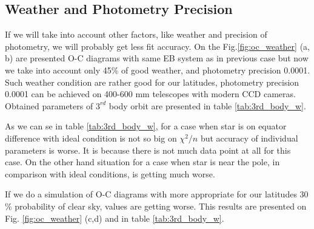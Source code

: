 \subsection{Weather and Photometry Precision}
If we will take into account other factors, like weather and precision of photometry, we will probably get less fit accuracy. 
On the Fig.\ref{fig:oc_weather} (a, b) are presented O-C diagrams with same EB system as in previous case but now we take into account only 45\% of good weather, and photometry precision 0.0001. Such weather condition are rather good for our latitudes, photometry precision 0.0001 can be achieved on 400-600 mm telescopes with modern CCD cameras. Obtained parameters of $3^{rd}$ body orbit are presented in table \ref{tab:3rd_body_w}.

As we can se in table \ref{tab:3rd_body_w}, for a case when star is on equator difference with ideal condition is not so big on $\chi^2/n$ but accuracy of individual parameters is worse. It is because there is not much data point at all for this case.
On the other hand situation for a case when star is near the pole, in comparison with ideal conditions, is getting much worse. 

If we do a simulation of O-C diagrams with more appropriate for our latitudes 30 \% probability of clear sky, values are getting worse. This results are presented on Fig. \ref{fig:oc_weather} (c,d) and in table \ref{tab:3rd_body_w}.

